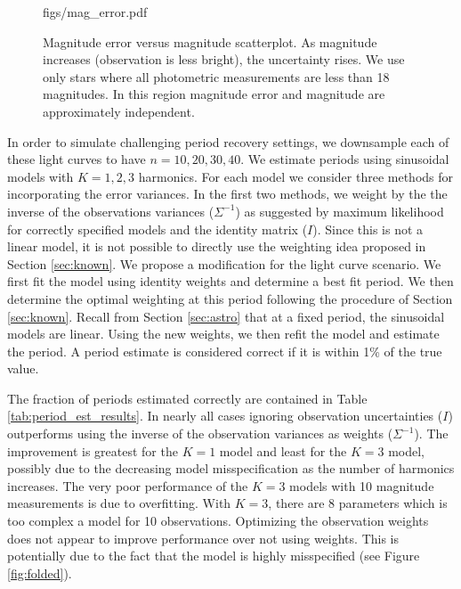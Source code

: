 \documentclass[ejs,ps,preprint]{imsart}
\numberwithin{equation}{section}
\theoremstyle{plain}
\begin{document}
\begin{figure}[t]
  \begin{center}
    \begin{includegraphics}[scale=.5]{figs/mag_error.pdf}
      \caption{Magnitude error versus magnitude scatterplot. As magnitude increases (observation is less bright), the uncertainty rises. We use only stars where all photometric measurements are less than 18 magnitudes. In this region magnitude error and magnitude are approximately independent.\label{fig:mag_error}}
    \end{includegraphics}
  \end{center}
\end{figure}

In order to simulate challenging period recovery settings, we downsample each of these light curves to have $n=10,20,30,40$. We estimate periods using sinusoidal models with $K=1,2,3$ harmonics. For each model we consider three methods for incorporating the error variances. In the first two methods, we weight by the the inverse of the observations variances ($\Sigma^{-1}$) as suggested by maximum likelihood for correctly specified models and the identity matrix ($I$). Since this is not a linear model, it is not possible to directly use the weighting idea proposed in Section \ref{sec:known}. We propose a modification for the light curve scenario. We first fit the model using identity weights and determine a best fit period. We then determine the optimal weighting at this period following the procedure of Section \ref{sec:known}. Recall from Section \ref{sec:astro} that at a fixed period, the sinusoidal models are linear. Using the new weights, we then refit the model and estimate the period. A period estimate is considered correct if it is within 1\% of the true value. 



The fraction of periods estimated correctly are contained in Table \ref{tab:period_est_results}. In nearly all cases ignoring observation uncertainties ($I$) outperforms using the inverse of the observation variances as weights ($\Sigma^{-1}$). The improvement is greatest for the $K=1$ model and least for the $K=3$ model, possibly due to the decreasing model misspecification as the number of harmonics increases. The very poor performance of the $K=3$ models with 10 magnitude measurements is due to overfitting. With $K=3$, there are 8 parameters which is too complex a model for 10 observations. Optimizing the observation weights does not appear to improve performance over not using weights. This is potentially due to the fact that the model is highly misspecified (see Figure \ref{fig:folded}).
\end{document}
